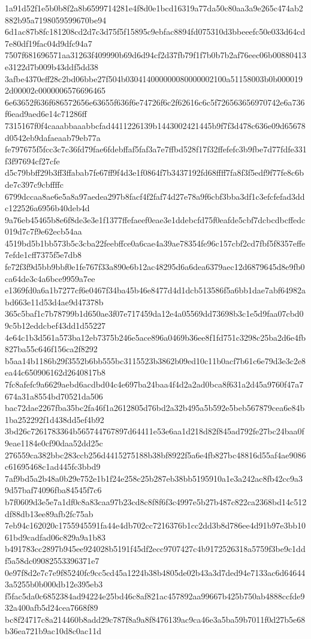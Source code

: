 {1a91d52f1e5b0b8f2a8b6599714281e4f8d0e1bcd16319a77da50c80aa3a9e265c474ab2882b95a7198059599670be94
6d1ac87b8fc181208cd2d7c3d75f5f15895c9ebfac8894fd075310d3bbeeefc50e033d64cd7e80df19fac04d9dfc94a7
7507f681696571aa31263f409990b69d6d94cf2d37fb79f1f7b0b7b2af76eec06b00880413e3122d7b009b43ddf5dd38
3afbe4370eff28c2bd06bbe27f504b030414000000080000002100a51158003b0b0000192d00002c0000006576696465
6e63652f636f686572656e63655f636f6e74726f6c2f62616c6c5f726563656970742e6a736f6ead9aed6e14c71286ff
7315167f0f4caaabbaaabbcfad4411226139b1443002421445b9f7f3d478c636e09d65678d0542eb9dafaeaab79eb77a
fe797675f5fcc3c7c36fd79fae6fdebffaf5faf3a7e7ffbd528f17f32ffefefc3b9fbe7d77fdfe331f3f97694cf27cfe
d5c79bbff29b3ff3ffabab7fe67ff9f4d3e1f0864f7b3437192fd68ffff7fa8f3f5edf9f77fe8c6bde7c397c9cbffffc
6799dccaa8ae6e5a8a97aedea297b8facf4f2faf74d27e78a9f6cbf3bba3df1c3efcfefad3ddc122526a6956b40deb4d
9a76eb45465b8e6f8de3e3e1f1377ffefaeef0eae3e1ddebcfd75f0eafde5cbf7dcbcdbcffedc019d7c7f9e62ecb54aa
4519bd5b1bb573b5c3cba22feebffce0a6cae4a39ae78354fe96c157cbf2cd7fbf5f8357effe7efde1cff7375f5e7db8
fe72f3f9d5bb9bbf0e1fe767f33a890e6b12ac48295d6a6dea6379aec12d6879645d8e9fb0ca64de3c4a6bce9959a7ee
e1369fd0a6a1b7277cf6e0467f34ba45b46e8477d4d1dcb513586f5a6bb1dae7abf64982abd663e11d53d4ae9d47378b
365c5baf1c7b78799b1d650ae3f07e717459da12e4a05569dd73698b3c1e5d9faa07cbd09c5b12eddcbef43dd1d55227
4e64c1b3d561a573ba12eb7375b246e5ace896a0469b36ee8f1fd751c3298c25ba2d6e4fb827ba55c646f156ca2f8292
b5aa14b1186b29f3552b6bb555bc3115523b3862b09ed10c11b0acf7b61c6e79d3e3c2e8ea44c650906162d2640817b8
7fc8afefc9a6629aebd6acdbd04c4e697ba24baa4f4d2a2ad0bca8f631a2d45a9760f47a7674a31a8554bd70521da506
bac72dae2267fba35bc2fa46f1a2612805d76bd2a32b495a5b592e5beb567879cea6e84b1ba252292f1d438dd5ef4b92
3bd26c7261783364b565744767897d64411e53e6aa1d218d82f845ad792fe27bc24baa0f9eae1184e0cf90daa52dd25c
276559ca382bbc283ccb256d4415275188b38bf8922f5a6e4fb827bc48816d55af4ae9086c61695468c1ad445fc3bbd9
7af9bd5a2b48a0b29e752e1b1f24e258c25b287eb38bb5195910a1e3a242ac8fb42cc9a39d57baf74096fba84545f7c6
b7f0609d3e5e7a1df0c8a83caa97b23cd8c8f8f6f3c4997e5b27b487c822ca2368bd14c512df88db13ee89afb2fc75ab
7eb94c162020c1755945591fa44e4db702cc7216376b1cc2dd3b8d786ee4d91b97e3bb1061bd9cadfad06c829a9a1b83
b491783cc2897b945ee924028b5191f45df2ecc9707427c4b9172526318a5759f3be9c1ddf5a58dc09082553396371e7
0e97f8d2e7c7e9f85240fc9cc5cd45a1224b38b4805de02b43a3d7ded94e7133ac6d646443a5255b0b000db12e395eb3
f5fac5da0c6852384ad94224e25bd46c8af821ac457892aa99667b425b750ab4888ccfde932a400afb5d24cea7668f89
bc8f24717c8a214460b8add29c787f8a9a8f8476139ac9ca46e3a5ba59b7011f0d27b5e68b36ea721b9ac10d8c0ac11d
}
